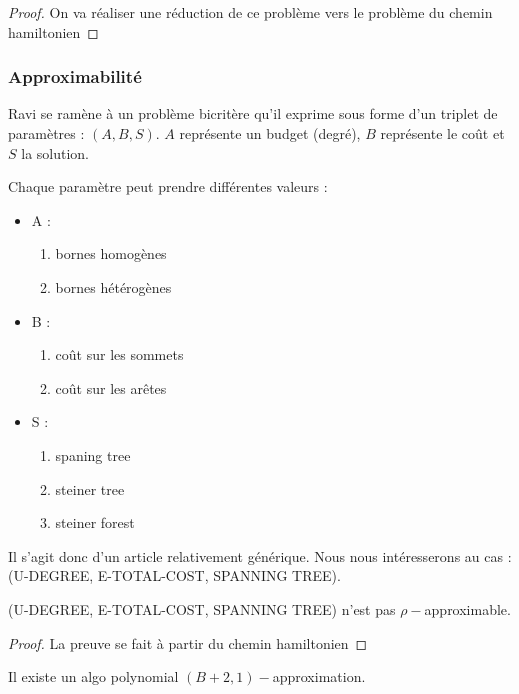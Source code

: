 \documentclass[a4paper,11pt]{thesis}
\begin{document}
{\begin{proof}
    On va réaliser une réduction de ce problème vers le problème du chemin hamiltonien
\end{proof}

\subsubsection{Approximabilit\'{e}}

Ravi se ramène à un problème bicritère qu'il exprime sous forme d'un triplet de paramètres : $(A, B,
S)$. $A$ représente un budget (degré), $B$ représente le coût et $S$ la solution.

Chaque paramètre peut prendre différentes valeurs :
\begin{itemize}
    \item A : \begin{enumerate}
            \item bornes homogènes
            \item bornes hétérogènes
        \end{enumerate}
    \item B : \begin{enumerate}
            \item coût sur les sommets
            \item coût sur les arêtes
        \end{enumerate}
    \item S : \begin{enumerate}
            \item spaning tree
            \item steiner tree
            \item steiner forest
        \end{enumerate}
\end{itemize}

Il s'agit donc d'un article relativement générique.
Nous nous intéresserons au cas : (U-DEGREE, E-TOTAL-COST, SPANNING TREE).
\begin{thrm}
    (U-DEGREE, E-TOTAL-COST, SPANNING TREE) n'est pas $\rho-$approximable.
\end{thrm}

\begin{proof}
    La preuve se fait à partir du chemin hamiltonien
\end{proof}

\begin{thrm}[Goemans]
    Il existe un algo polynomial $(B+2, 1)-$approximation.
\end{thrm}

}
\end{document}
